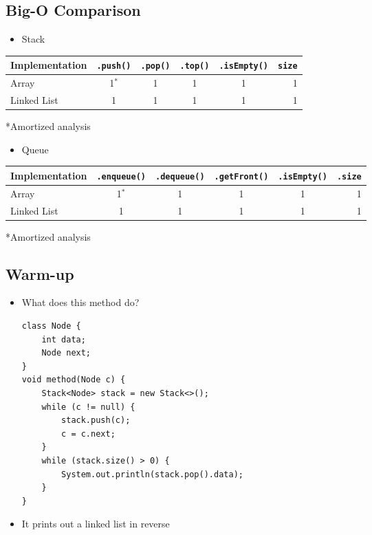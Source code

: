 \documentclass[10pt]{article}
\begin{document}
\subsection*{Big-O Comparison}
\begin{itemize}
    \item Stack
\end{itemize}
\begin{center}
    \begin{tabular}{lccccr} \toprule
        Implementation & \texttt{.push()} & \texttt{.pop()} & \texttt{.top()} & \texttt{.isEmpty()} & \texttt{size} \\ \midrule
        Array & 1$^*$ & 1 & 1 & 1 & 1 \\
        Linked List & 1 & 1 & 1 & 1 & 1 \\ \bottomrule
    \end{tabular}
    \begin{center}*Amortized analysis\end{center}
\end{center}
\begin{itemize}
    \item Queue
\end{itemize}
\begin{center}
    \begin{tabular}{lccccr} \toprule
        Implementation & \texttt{.enqueue()} & \texttt{.dequeue()} & \texttt{.getFront()} & \texttt{.isEmpty()} & \texttt{.size} \\ \midrule
        Array & 1$^*$ & 1 & 1 & 1 & 1 \\
        Linked List & 1 & 1 & 1 & 1 & 1 \\ \bottomrule
    \end{tabular}
    \begin{center}*Amortized analysis\end{center}
\end{center}


\subsection*{Warm-up}
\begin{itemize}
    \item What does this method do?

\begin{verbatim}
class Node {
    int data;
    Node next;
}
void method(Node c) {
    Stack<Node> stack = new Stack<>();
    while (c != null) {
        stack.push(c);
        c = c.next;
    }
    while (stack.size() > 0) {
        System.out.println(stack.pop().data);
    }
}
\end{verbatim}
    \item It prints out a linked list in reverse

\end{itemize}
\end{document}
